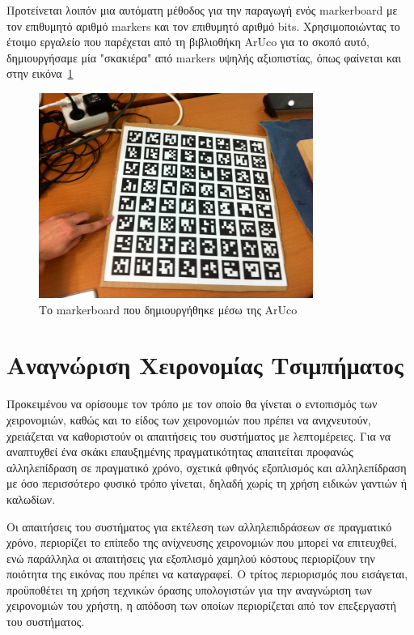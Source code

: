 Προτείνεται λοιπόν μια αυτόματη μέθοδος για την παραγωγή ενός markerboard με τον επιθυμητό αριθμό markers και τον επιθυμητό αριθμό bits. Χρησιμοποιώντας το έτοιμο εργαλείο που παρέχεται από τη βιβλιοθήκη ArUco για το σκοπό αυτό, δημιουργήσαμε μία "σκακιέρα" από markers υψηλής αξιοπιστίας, όπως φαίνεται και στην εικόνα~\ref{fig:markerboard}




\begin{figure}[H]
    \centering
    \includegraphics[width=0.8\textwidth]{Files/Figures/markerboard.jpg}
    \caption[Το markerboard που δημιουργήθηκε μέσω της ArUco]{Το markerboard που δημιουργήθηκε μέσω της ArUco}
    \label{fig:markerboard}
\end{figure}





\section{Αναγνώριση Χειρονομίας Τσιμπήματος} \label{section:pinch}



Προκειμένου να ορίσουμε τον τρόπο με τον οποίο θα γίνεται ο εντοπισμός των χειρονομιών, καθώς και το είδος των χειρονομιών που πρέπει να ανιχνευτούν, χρειάζεται να καθοριστούν οι απαιτήσεις του συστήματος με λεπτομέρειες.
Για να αναπτυχθεί ένα σκάκι επαυξημένης πραγματικότητας απαιτείται προφανώς αλληλεπίδραση σε πραγματικό χρόνο, σχετικά φθηνός εξοπλισμός και αλληλεπίδραση με όσο περισσότερο φυσικό τρόπο γίνεται, δηλαδή χωρίς τη χρήση ειδικών γαντιών ή καλωδίων. 

Οι απαιτήσεις του συστήματος για εκτέλεση των αλληλεπιδράσεων σε πραγματικό χρόνο, περιορίζει το επίπεδο της ανίχνευσης χειρονομιών που μπορεί να επιτευχθεί, ενώ παράλληλα οι απαιτήσεις για εξοπλισμό χαμηλού κόστους περιορίζουν την ποιότητα της εικόνας που πρέπει να καταγραφεί. Ο τρίτος περιορισμός που εισάγεται, προϋποθέτει τη χρήση τεχνικών όρασης υπολογιστών για την αναγνώριση των χειρονομιών του χρήστη, η απόδοση των οποίων περιορίζεται από τον επεξεργαστή του συστήματος. 



